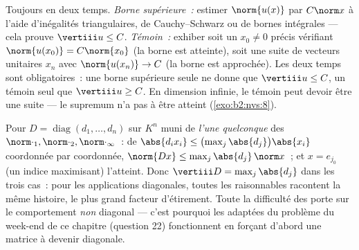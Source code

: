 \begin{method}\label{met:b2:nvs:opnorm}
Toujours en deux temps. \emph{Borne supérieure~:} estimer
$\norm{u(x)}$ par $C\norm x$ à l'aide d'inégalités triangulaires, de
Cauchy--Schwarz ou de bornes intégrales --- cela prouve $\vertiii u
\leq C$. \emph{Témoin~:} exhiber soit un $x_0 \neq 0$ précis vérifiant
$\norm{u(x_0)} = C\norm{x_0}$ (la borne est atteinte), soit une
suite de vecteurs unitaires $x_n$ avec $\norm{u(x_n)} \to C$ (la
borne est approchée). Les deux temps sont obligatoires~: une borne
supérieure seule ne donne que $\vertiii u \leq C$, un témoin seul que
$\vertiii u \geq C$. En dimension infinie, le témoin peut devoir être
une suite --- le supremum n'a pas à être atteint
(\cref{exo:b2:nvs:8}).
\end{method}

\begin{example}\label{ex:b2:nvs:diagonalnorm}
Pour $D = \operatorname{diag}(d_1, \dots, d_n)$ sur $K^n$ muni de
\emph{l'une quelconque} des  $\norm\cdot_1, \norm\cdot_2,
\norm\cdot_\infty$~: de $\abs{d_ix_i} \leq
\bigl(\max_j\abs{d_j}\bigr)\abs{x_i}$ coordonnée par coordonnée,
$\norm{Dx} \leq \max_j\abs{d_j}\,\norm x$~; et $x = e_{j_0}$
(un indice maximisant) l'atteint. Donc $\vertiii D =
\max_j\abs{d_j}$ dans les trois cas~: pour les applications
diagonales, toutes les  raisonnables racontent la même
histoire, le plus grand facteur d'étirement. Toute la difficulté des
 porte sur le comportement \emph{non} diagonal ---
c'est pourquoi les  adaptées du problème du week-end de ce
chapitre (question 22) fonctionnent en forçant d'abord une matrice à
devenir diagonale.
\end{example}

